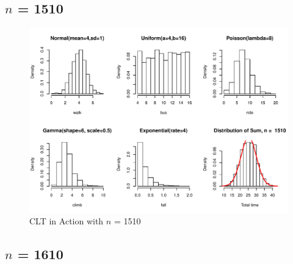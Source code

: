 \documentclass[11pt,letter]{article}\usepackage[]{graphicx}\usepackage[]{color}
\makeatletter
\def\maxwidth{ %
  \ifdim\Gin@nat@width>\linewidth
    \linewidth
  \else
    \Gin@nat@width
  \fi
}
\newenvironment{knitrout}{}{} %
\makeatother
\begin{document}
\subsection{$n$ = 1510}

\begin{knitrout}
\color{fgcolor}\begin{figure}[h]

{\centering \includegraphics[width=\maxwidth]{figure/n-1510-1} 

}

\caption[CLT in Action with ]{CLT in Action with $n$ = 1510}\label{fig:n-1510}
\end{figure}


\end{knitrout}
\newpage
\subsection{$n$ = 1610}
\end{document}
